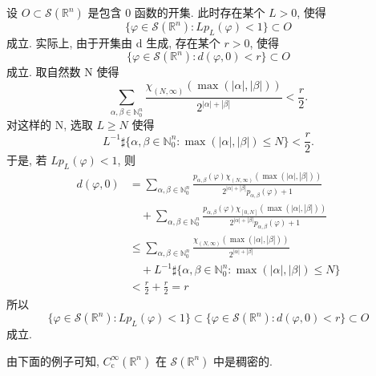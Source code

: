 \begin{example}\label{exa:5.6}
设 $O \subset \mathcal{S}(\mathbb{R}^{n})$ 是包含 0 函数的开集. 此时存在某个 $L > 0$, 使得
\[
\{\varphi \in \mathcal{S}(\mathbb{R}^{n}) : Lp_{L}(\varphi) < 1\} \subset O
\]
成立. 实际上, 由于开集由 d 生成, 存在某个 $r > 0$, 使得
\[
\{\varphi \in \mathcal{S}(\mathbb{R}^{n}) : d(\varphi, 0) < r\} \subset O
\]
成立. 取自然数 N 使得
\[
\sum_{\alpha, \beta \in \mathbb{N}_{0}^{n}}\frac{\chi_{(N,\infty)}(\max(|\alpha|, |\beta|))}{2^{|\alpha|+|\beta|}} < \frac{r}{2}.
\]
对这样的 N, 选取 $L \geq N$ 使得
\[
L^{-1}\sharp\{\alpha, \beta \in \mathbb{N}_{0}^{n} : \max(|\alpha|, |\beta|) \leq N\} < \frac{r}{2}.
\]
于是, 若 $Lp_{L}(\varphi) < 1$, 则
\begin{align*}
d(\varphi, 0) &= \sum_{\alpha, \beta \in \mathbb{N}_{0}^{n}}\frac{p_{\alpha,\beta}(\varphi)\chi_{(N,\infty)}(\max(|\alpha|, |\beta|))}{2^{|\alpha|+|\beta|}p_{\alpha,\beta}(\varphi)+1} \\
&\quad + \sum_{\alpha, \beta \in \mathbb{N}_{0}^{n}}\frac{p_{\alpha,\beta}(\varphi)\chi_{[0,N]}(\max(|\alpha|, |\beta|))}{2^{|\alpha|+|\beta|}p_{\alpha,\beta}(\varphi)+1} \\
&\leq \sum_{\alpha, \beta \in \mathbb{N}_{0}^{n}}\frac{\chi_{(N,\infty)}(\max(|\alpha|, |\beta|))}{2^{|\alpha|+|\beta|}} \\
&\quad + L^{-1}\sharp\{\alpha, \beta \in \mathbb{N}_{0}^{n} : \max(|\alpha|, |\beta|) \leq N\} \\
&< \frac{r}{2} + \frac{r}{2} = r
\end{align*}
所以
\[
\{\varphi \in \mathcal{S}(\mathbb{R}^{n}) : Lp_{L}(\varphi) < 1\} \subset \{\varphi \in \mathcal{S}(\mathbb{R}^{n}) : d(\varphi, 0) < r\} \subset O
\]
成立.
\end{example}

由下面的例子可知, $C_{\mathrm{c}}^{\infty}(\mathbb{R}^{n})$ 在 $\mathcal{S}(\mathbb{R}^{n})$ 中是稠密的.

